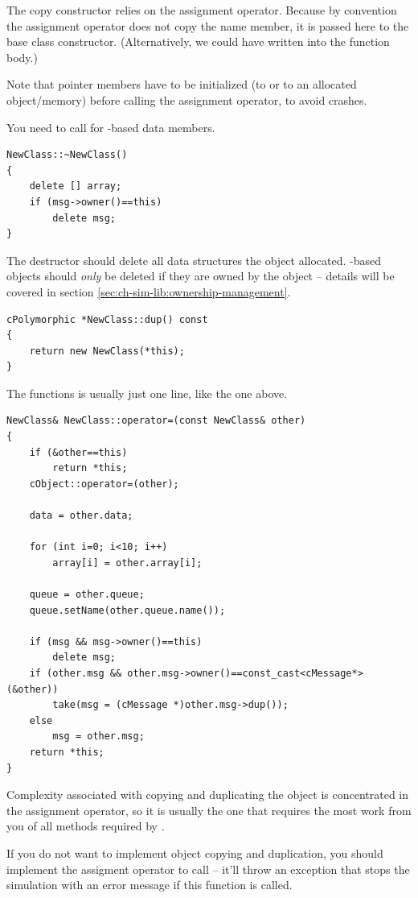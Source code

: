 The copy constructor relies on the assignment operator. Because
by convention the assignment operator does not copy the
name member, it is passed here to the base class constructor.
(Alternatively, we could have written 
into the function body.)

Note that pointer members have to be initialized (to  or to an
allocated object/memory) before calling the assignment operator,
to avoid crashes.

You need to call  for -based data members.

\begin{verbatim}
NewClass::~NewClass()
{
    delete [] array;
    if (msg->owner()==this)
        delete msg;
}
\end{verbatim}

The destructor should delete all data structures the object allocated.
-based objects should \textit{only} be deleted if they
are owned by the object -- details will be covered in section
\ref{sec:ch-sim-lib:ownership-management}.

\begin{verbatim}
cPolymorphic *NewClass::dup() const
{
    return new NewClass(*this);
}
\end{verbatim}

The  functions is usually just one line, like the one above.

\begin{verbatim}
NewClass& NewClass::operator=(const NewClass& other)
{
    if (&other==this)
        return *this;
    cObject::operator=(other);

    data = other.data;

    for (int i=0; i<10; i++)
        array[i] = other.array[i];

    queue = other.queue;
    queue.setName(other.queue.name());

    if (msg && msg->owner()==this)
        delete msg;
    if (other.msg && other.msg->owner()==const_cast<cMessage*>(&other))
        take(msg = (cMessage *)other.msg->dup());
    else
        msg = other.msg;
    return *this;
}
\end{verbatim}

Complexity associated with copying and duplicating the object
is concentrated in the assignment operator, so it is usually
the one that requires the most work from you of all methods
required by .

If you do not want to implement object copying and duplication,
you should implement the assigment operator to call
 -- it'll throw an exception that
stops the simulation with an error message if this function
is called.

